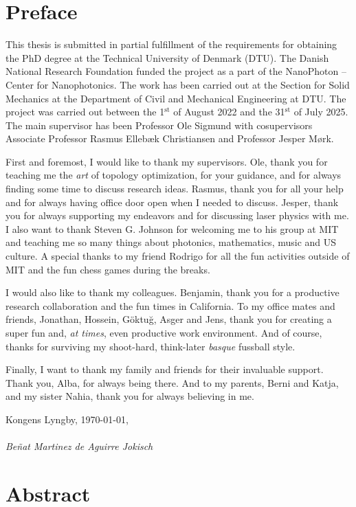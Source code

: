 \chapter*{Preface}
This thesis is submitted in partial fulfillment of the requirements for obtaining
the PhD degree at the Technical University of Denmark
(DTU). The Danish National Research Foundation funded the project as a part of
the NanoPhoton -- Center for Nanophotonics. The work has been carried out at the
Section for Solid Mechanics at the Department of Civil and Mechanical Engineering
at DTU. The project was carried out between the 1$^\text{st}$ of August 2022 and the 31$^\text{st}$
of July 2025. The main supervisor has been Professor Ole Sigmund with cosupervisors Associate Professor Rasmus Ellebæk Christiansen and Professor Jesper
Mørk.

First and foremost, I would like to thank my supervisors. Ole, thank you for teaching me the \emph{art} of topology optimization, for your guidance, and for always
finding some time to discuss research ideas. Rasmus, thank you for all your help and for always having office door open when I needed to discuss.
Jesper, thank you for always supporting my endeavors and for discussing 
laser physics with me. I also want to thank Steven G. Johnson for welcoming me to his group at MIT and teaching me so many things about photonics,
mathematics, music and US culture. A special thanks to my friend Rodrigo for all the fun activities outside of MIT and the fun chess games 
during the breaks.

I would also like to thank my colleagues. Benjamin, thank you
for a productive research collaboration and the fun times in California. To my office mates and friends, Jonathan, Hossein, Göktuğ, Asger and Jens, thank you for creating 
a super fun and, \emph{at times}, even productive work environment. And of course, thanks for surviving my shoot-hard, think-later \emph{basque} fussball style.


Finally, I want to thank my family and friends for their invaluable support. Thank you, Alba, for always being there. 
And to my parents, Berni and Katja, and my sister Nahia, thank you for always believing in me.

\noindent Kongens Lyngby, \today,\\
\vspace{0.1cm}\\
\noindent \textit{Beñat Martinez de Aguirre Jokisch}

\chapter*{Abstract}

